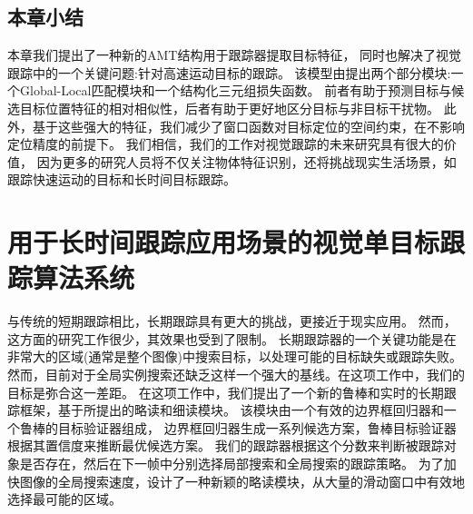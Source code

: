 \documentclass[promaster]{thesis-uestc}
\begin{document}
\begin{table}[htp!]
    \centering
    \caption{跟踪器分别在不同帧率下OTB100和LaSOT数据集上的实验结果，结果以AUC分数为代表。
     }
    \vspace{2mm}
    \label{t88}
\end{table}


\section{本章小结}
本章我们提出了一种新的AMT结构用于跟踪器提取目标特征，
同时也解决了视觉跟踪中的一个关键问题:针对高速运动目标的跟踪。
该模型由提出两个部分模块:一个Global-Local匹配模块和一个结构化三元组损失函数。
前者有助于预测目标与候选目标位置特征的相对相似性，后者有助于更好地区分目标与非目标干扰物。
此外，基于这些强大的特征，我们减少了窗口函数对目标定位的空间约束，在不影响定位精度的前提下。
我们相信，我们的工作对视觉跟踪的未来研究具有很大的价值，
因为更多的研究人员将不仅关注物体特征识别，还将挑战现实生活场景，如跟踪快速运动的目标和长时间目标跟踪。

\chapter{用于长时间跟踪应用场景的视觉单目标跟踪算法系统}
与传统的短期跟踪相比，长期跟踪具有更大的挑战，更接近于现实应用。
然而，这方面的研究工作很少，其效果也受到了限制。
长期跟踪器的一个关键功能是在非常大的区域(通常是整个图像)中搜索目标，以处理可能的目标缺失或跟踪失败。
然而，目前对于全局实例搜索还缺乏这样一个强大的基线。在这项工作中，我们的目标是弥合这一差距。
在这项工作中，我们提出了一个新的鲁棒和实时的长期跟踪框架，基于所提出的略读和细读模块。
该模块由一个有效的边界框回归器和一个鲁棒的目标验证器组成，
边界框回归器生成一系列候选方案，鲁棒目标验证器根据其置信度来推断最优候选方案。
我们的跟踪器根据这个分数来判断被跟踪对象是否存在，然后在下一帧中分别选择局部搜索和全局搜索的跟踪策略。
为了加快图像的全局搜索速度，设计了一种新颖的略读模块，从大量的滑动窗口中有效地选择最可能的区域。
\end{document}
